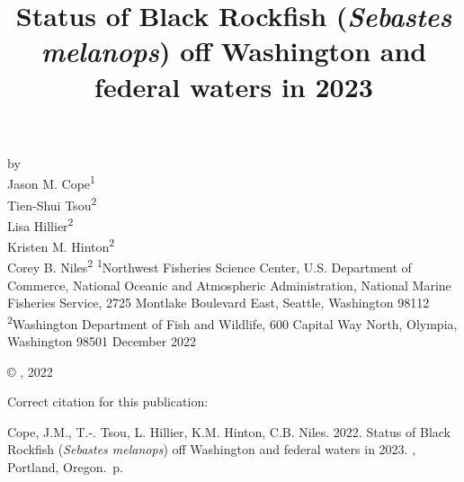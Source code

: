 \documentclass[11pt,
  english,
  letterpaper,
]{article}
\date{}
\newcommand{\trTitle}{Status of Black Rockfish (\emph{Sebastes melanops}) off Washington and federal waters in 2023}
\newcommand{\trYear}{2022}
\newcommand{\trMonth}{December}
\newcommand{\trAuthsBack}{Cope, J.M., T.-. Tsou, L. Hillier, K.M. Hinton, C.B. Niles}
\newcommand{\trCitation}{
\begin{hangparas}{1em}{1}
\trAuthsBack{}. \trYear{}. \trTitle{}. \glsentrylong{pfmc}, Portland, Oregon. \pageref{LastPage}{}\,p.
\end{hangparas}}
\begin{document}

\renewcommand*{\thefootnote}{\fnsymbol{footnote}}

\small
\thispagestyle{empty}
\noindent
\begin{center}
\title{Status of Black Rockfish (\emph{Sebastes melanops}) off Washington and federal waters in 2023}
\vspace{1.5cm}
{\Large\textbf{}}
\vfill
by\\
Jason M. Cope\textsuperscript{1}\\
Tien-Shui Tsou\textsuperscript{2}\\
Lisa Hillier\textsuperscript{2}\\
Kristen M. Hinton\textsuperscript{2}\\
Corey B. Niles\textsuperscript{2}\vfill
\textsuperscript{1}Northwest Fisheries Science Center, U.S. Department of Commerce, National Oceanic and Atmospheric Administration, National Marine Fisheries Service, 2725 Montlake Boulevard East, Seattle, Washington 98112\\
\textsuperscript{2}Washington Department of Fish and Wildlife, 600 Capital Way North, Olympia, Washington 98501\vfill
\trMonth{} \trYear{}
\end{center}
\clearpage

\thispagestyle{empty}
\vspace*{\fill}
\begin{center}
\copyright{} , \trYear{}\\
\end{center}
\par
\bigskip
\noindent
Correct citation for this publication:
\bigskip
\par
\trCitation{}
\clearpage


\tableofcontents\clearpage
\label{TRlastRoman}
\clearpage

\newpage
\thispagestyle{empty} %

\pagestyle{plain}  %
\renewcommand*{\thefootnote}{\arabic{footnote}}  %
\setcounter{footnote}{0}  %
\renewcommand{\headrulewidth}{0.5pt}
\renewcommand{\footrulewidth}{0.5pt}
\end{document}
